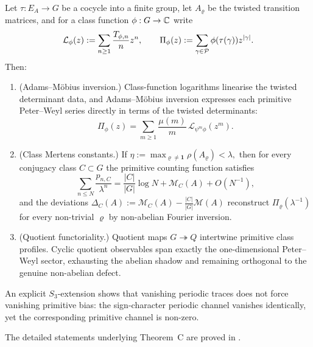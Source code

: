 \begin{theorem}
  \label{thm:intro-finite-group}
  Let \(\tau:E_A\to G\) be a cocycle into a finite group, let
  \(A_\varrho\) be the twisted transition matrices, and for a class
  function \(\phi:G\to\mathbb{C}\) write
  \[
    \mathcal L_\phi(z)
    :=\sum_{n\ge 1}\frac{T_{\phi,n}}{n}z^n,
    \qquad
    \Pi_\phi(z):=\sum_{\gamma\in\mathcal P}\phi(\tau(\gamma))z^{|\gamma|}.
  \]
  Then:
  \begin{enumerate}[label=\textup{(\roman*)}]
    \item \textup{(Adams--M\"obius inversion.)} Class-function
      logarithms linearise the twisted determinant data, and
      Adams--M\"obius inversion expresses each primitive Peter--Weyl
      series directly in terms of the twisted determinants:
      \[
        \Pi_\phi(z)
        =\sum_{m\ge 1}\frac{\mu(m)}{m}\,
          \mathcal L_{\psi^m\phi}(z^m).
      \]
    \item \textup{(Class Mertens constants.)} If
      \(
        \eta:=\max_{\varrho\neq\mathbf 1}\rho(A_\varrho)<\lambda,
      \)
      then for every conjugacy class \(C\subset G\) the primitive
      counting function satisfies
      \[
        \sum_{n\le N}\frac{p_{n,C}}{\lambda^n}
        =\frac{|C|}{|G|}\log N+\mathcal M_C(A)+O(N^{-1}),
      \]
      and the deviations
      \(\Delta_C(A):=\mathcal M_C(A)-\frac{|C|}{|G|}\mathcal M(A)\)
      reconstruct \(\Pi_\varrho(\lambda^{-1})\) for every non-trivial
      \(\varrho\) by non-abelian Fourier inversion.
    \item \textup{(Quotient functoriality.)} Quotient maps
      \(G\twoheadrightarrow Q\) intertwine primitive class profiles.
      Cyclic quotient observables span exactly the one-dimensional
      Peter--Weyl sector, exhausting the abelian shadow and remaining
      orthogonal to the genuine non-abelian defect.
  \end{enumerate}
  An explicit \(S_3\)-extension shows that vanishing periodic traces
  does not force vanishing primitive bias: the sign-character periodic
  channel vanishes identically, yet the corresponding primitive channel
  is non-zero.
\end{theorem}

The detailed statements underlying Theorem~C are proved in
.

